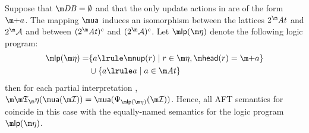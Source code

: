 \begin{theorem}\label{thm:lplink}
  Suppose that $\db=\emptyset$ and that the only update actions in \aics are of the form $\add a$.
  The mapping $\actof$ induces an isomorphism between the lattices $2^\atoms$ and $2^\acts$ and between $(2^\atoms)^c$ and $(2^\acts)^c$. 
  Let $\lpop(\aics)$ denote the following logic program:  
 \begin{align*}
  \lpop(\aics)=& \{a \lrule \nup(r)\mid r\in \aics, \head(r)= \add a\}\\
  &\cup \{a \lrule a\mid a \in \atoms\}
 \end{align*}
 then for each partial interpretation \pstruct, $\Ap(\actof(\pstruct)) = \actof(\Psi_{\lpop(\aics)}(\pstruct))$. 
Hence, all AFT semantics for \fulldb coincide in this case with the equally-named semantics for the logic program $\lpop(\aics)$. 
\end{theorem}
